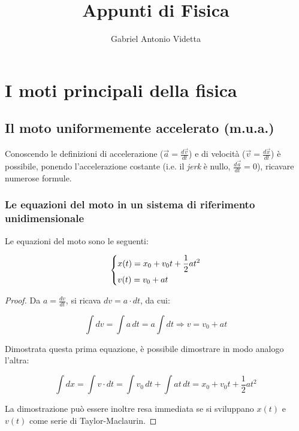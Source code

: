\documentclass[oneside]{book}
\begin{document}
\author{Gabriel Antonio Videtta}
\title{Appunti di Fisica}

\maketitle

\tableofcontents

\chapter{I moti principali della fisica}

\section{Il moto uniformemente accelerato (m.u.a.)}

Conoscendo le definizioni di accelerazione ($\vec{a} = \frac{d\vec{v}}{dt}$)
e di velocità ($\vec{v} = \frac{d\vec{x}}{dt}$) è possibile, ponendo l'accelerazione
costante (i.e. il \textit{jerk} è nullo, $\frac{d\vec{a}}{dt} = 0$), ricavare numerose formule.

\subsection{Le equazioni del moto in un sistema di riferimento unidimensionale}

Le equazioni del moto sono le seguenti:

\begin{equation}
    \begin{dcases}
        x(t)=x_0+v_0t+\frac{1}{2}at^2 \\
        v(t)=v_0+at
    \end{dcases}
    \label{eq:mua}
\end{equation}

\begin{proof}
    Da $a=\frac{dv}{dt}$, si ricava $dv=a\cdot dt$, da cui:

    \begin{equation*}
        \int dv=\int a\, dt = a \int dt \Rightarrow v=v_0+at
    \end{equation*}

    Dimostrata questa prima equazione, è possibile dimostrare in modo analogo l'altra:

    \begin{equation*}
        \int dx=\int v\cdot dt = \int v_0\, dt + \int at\, dt = x_0+v_0t+\frac12at^2
    \end{equation*}

    La dimostrazione può essere inoltre resa immediata se si sviluppano $x(t)$ e
    $v(t)$ come serie di Taylor-Maclaurin.

\end{proof}
\end{document}
